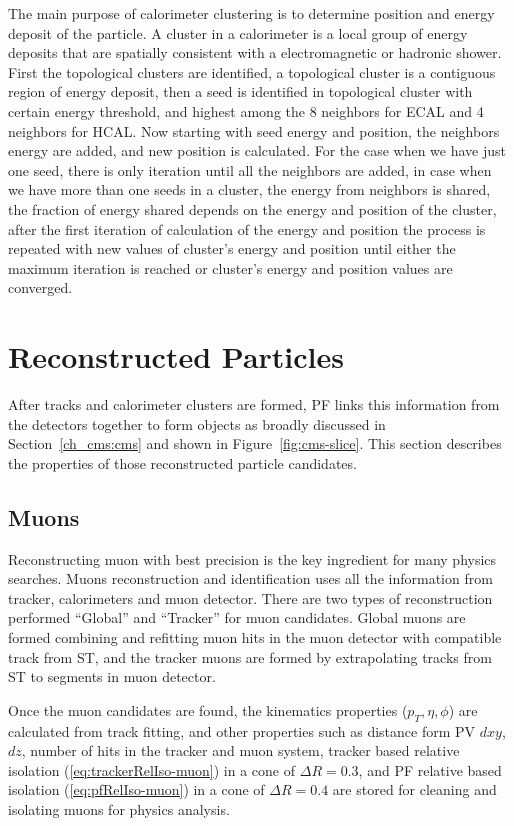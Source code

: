 The main purpose of calorimeter clustering is to determine position and
energy deposit of the particle. A cluster in a calorimeter is a local group of
energy deposits that are spatially consistent with a electromagnetic
or hadronic shower. First the topological
clusters are identified, a topological cluster is a contiguous region of energy
deposit, then a seed is identified in topological cluster with certain energy
threshold, and highest among the 8 neighbors for \gls{ECAL} and 4 neighbors for \gls{HCAL}.
Now starting with seed energy and position, the neighbors energy are added, and
new position is calculated. For the case when we have just one seed, there is only
iteration until all the neighbors are added, in case when we have more than one seeds
in a cluster, the energy from neighbors is shared, the fraction of energy shared
depends on the energy and position of the cluster, after the first
iteration of calculation of the energy and position the
process is repeated with new values of cluster's energy and
position until either the maximum iteration is reached or cluster's energy and position
values are converged.

\section{
  Reconstructed Particles
 }

After tracks and calorimeter clusters are formed, \gls{PF} links this information
from the detectors together to form objects as broadly discussed in
Section~\ref{ch_cms:cms} and shown in Figure~\ref{fig:cms-slice}. This section
describes the properties of those reconstructed particle candidates.

\subsection{
  Muons
}

Reconstructing muon with best precision is the key ingredient for many physics
searches. Muons reconstruction and identification uses all the information from tracker,
calorimeters and muon detector. There are two types of reconstruction performed
``Global'' and ``Tracker'' for muon candidates. Global muons are formed combining and refitting
muon hits in the muon detector with compatible track from \gls{ST}, and the tracker muons
are formed by extrapolating tracks from \gls{ST} to segments in muon detector.

Once the muon candidates are found, the kinematics properties (\( p_T, \eta, \phi \))
are calculated from track fitting, and other properties such as distance form
\gls{PV} \( dxy \), \( dz \), number of hits in the tracker and muon system, tracker
based relative isolation (\ref{eq:trackerRelIso-muon}) in a cone of \( \Delta R = 0.3 \), and
\gls{PF} relative based isolation (\ref{eq:pfRelIso-muon})
in a cone of \( \Delta R = 0.4 \) are stored for cleaning and isolating muons for
physics analysis.

